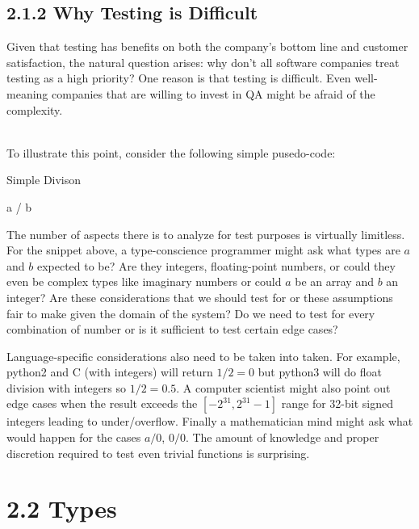 \documentclass[12pt]{report}
\begin{document}
\subsection*{2.1.2 Why Testing is Difficult}
\par\noindent
Given that testing has benefits on both the company's bottom line and customer satisfaction, the natural question arises: why don't all software companies treat testing as a high priority? One reason is that testing is difficult. Even well-meaning companies that are willing to invest in QA might be afraid of the complexity.
\par\indent \\
To illustrate this point, consider the following simple pusedo-code:

\begin{algorithm}
	\caption{Simple Divison}
	\begin{algorithmic}
	
	  \State \Return a / b
	\EndFunction
	\end{algorithmic}
\end{algorithm}

\par\noindent
The number of aspects there is to analyze for test purposes is virtually limitless. For the snippet above, a type-conscience programmer might ask what types are $a$ and $b$ expected to be? Are they integers, floating-point numbers, or could they even be complex types like imaginary numbers or could $a$ be an array and $b$ an integer? Are these considerations that we should test for or these assumptions fair to make given the domain of the system? Do we need to test for every combination of number or is it sufficient to test certain edge cases?\\

\par\noindent
Language-specific considerations also need to be taken into taken. For example, python2 and C (with integers) will return $1 / 2 = 0$ but python3 will do float division with integers so $1 / 2 = 0.5$. A computer scientist might also point out edge cases when the result exceeds the $[-2^{31}, 2^{31}-1]$ range for 32-bit signed integers leading to under/overflow. Finally a mathematician mind might ask what would happen for the cases $a/0$, $0/0$. The amount of knowledge and proper discretion required to test even trivial functions is surprising.

\section*{2.2 Types}
\end{document}
